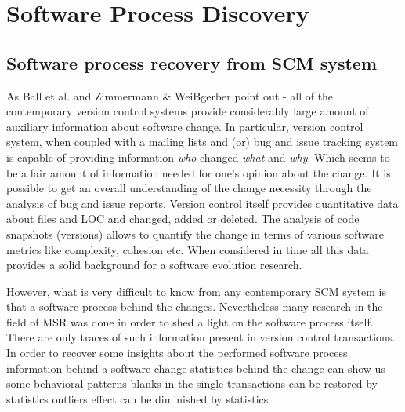 \chapter{Software Process Discovery}
\section{Software process recovery from SCM system}
As Ball et al. \cite{citeulike:9004378} and Zimmermann \& WeiBgerber \cite{citeulike:5058462} point out - all of the contemporary version control systems provide considerably large amount of auxiliary information about software change. In particular, version control system, when coupled with a mailing lists and (or) bug and issue tracking system is capable of providing information \textit{who} changed \textit{what} and \textit{why}. Which seems to be a fair amount of information needed for one's opinion about the change. It is possible to get an overall understanding of the change necessity through the analysis of bug and issue reports. Version control itself provides quantitative data about files and LOC and changed, added or deleted. The analysis of code snapshots (versions) allows to quantify the change in terms of various software metrics like complexity, cohesion etc. When considered in time all this data provides a solid background for a software evolution research.

However, what is very difficult to know from any contemporary SCM system is that a software process behind the changes. Nevertheless many research in the field of MSR was done in order to shed a light on the software process itself. \cite{citeulike:9007622} There are only traces of such information present in version control transactions. In order to recover some insights about the performed software process information behind a software change statistics behind the change can show us some behavioral patterns blanks in the single transactions can be restored by statistics
outliers effect can be diminished by statistics

